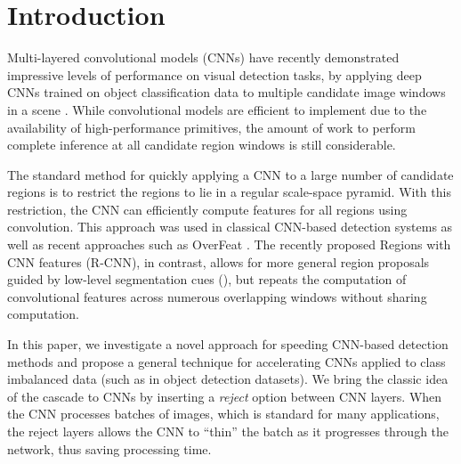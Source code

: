 \section{Introduction}\label{introduction}

Multi-layered convolutional models (CNNs) have recently demonstrated impressive levels of performance on visual detection tasks, by applying deep CNNs trained on object classification data to multiple candidate image windows in a scene \cite{Sermanet-ICLR-2014,Girshick-CVPR-2014}.
While convolutional models are efficient to implement due to the availability of high-performance primitives, the amount of work to perform complete inference at all candidate region windows is still considerable.

The standard method for quickly applying a CNN to a large number of candidate regions is to restrict the regions to lie in a regular scale-space pyramid.
With this restriction, the CNN can efficiently compute features for all regions using convolution.
This approach was used in classical CNN-based detection systems as well as recent approaches such as OverFeat \cite{Sermanet-ICLR-2014}.
The recently proposed Regions with CNN features (R-CNN), in contrast, allows for more general region proposals guided by low-level segmentation cues (\cite{Uijlings-IJCV-2013}), but repeats the computation of convolutional features across numerous overlapping windows without sharing computation.

In this paper, we investigate a novel approach for speeding CNN-based detection methods and propose a general technique for accelerating CNNs applied to class imbalanced data (such as in object detection datasets).
We bring the classic idea of the cascade to CNNs by inserting a \emph{reject} option between CNN layers.
When the CNN processes batches of images, which is standard for many applications, the reject layers allows the CNN to ``thin'' the batch as it progresses through the network, thus saving processing time.
